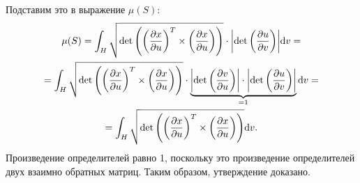 Подставим это в выражение $\mu(S)$:
\begin{multline}
    \mu(S) = \int_{H} \sqrt{\det\pqty{\pqty{\pdv{x}{u}}^{T} \times \pqty{\pdv{x}{u}}}} \cdot \abs{\det\pqty{\pdv{u}{v}}} \dd v = \\ = \int_{H} \sqrt{\det\pqty{\pqty{\pdv{x}{u}}^{T} \times \pqty{\pdv{x}{u}}}} \cdot \underbrace{\abs{\det\pqty{\pdv{v}{u}}} \cdot \abs{\det\pqty{\pdv{u}{v}}}}_{= 1} \dd v = \\ = \int_{H} \sqrt{\det\pqty{\pqty{\pdv{x}{u}}^{T} \times \pqty{\pdv{x}{u}}}} \dd v.
\end{multline}
Произведение определителей равно 1, поскольку это произведение определителей двух взаимно обратных матриц.
Таким образом, утверждение доказано.